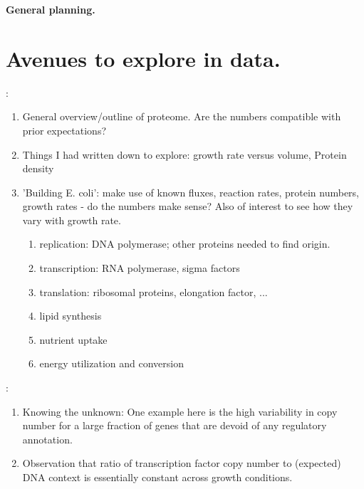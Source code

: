 \documentclass[preprint,10pt]{elsarticle}
\date{}
\begin{document}
\begin{flushleft}
{\Large
\textbf{General planning.}
}\\
\end{flushleft}

\section*{Avenues to explore in data.}

:
\begin{enumerate}
  \item General overview/outline of proteome. Are the numbers compatible with prior expectations?
  \item Things I had written down to explore:  growth rate versus volume, Protein density
  \item 'Building E. coli': make use of known fluxes, reaction rates, protein numbers, growth rates -
  do the numbers make sense? Also of interest to see how they vary with growth rate.
  \begin{enumerate}
    \item replication: DNA polymerase; other proteins needed to find origin.
    \item transcription: RNA polymerase, sigma factors
    \item translation: ribosomal proteins, elongation factor, ...
    \item lipid synthesis
    \item nutrient uptake
    \item energy utilization and conversion
  \end{enumerate}
\end{enumerate}

:
\begin{enumerate}
  \item Knowing the unknown: One example here is the high variability in copy number for a
  large fraction of genes that are devoid of any regulatory annotation.
  \item Observation that ratio of transcription factor copy number to (expected) DNA context is
  essentially constant across growth conditions.
\end{enumerate}
\end{document}

